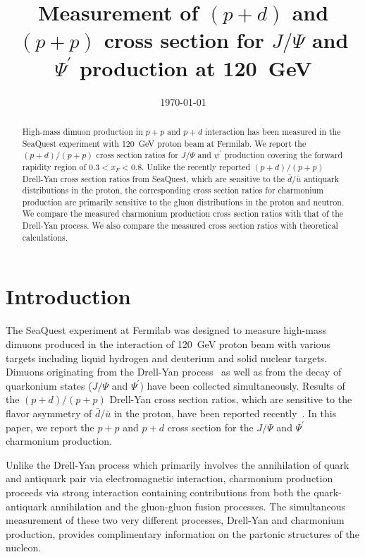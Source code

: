 \documentclass[reprint,aps,unsortedaddress,superscriptaddress,prd,floatfix,showpacs,linenumbers]{revtex4-2}
\begin{document}
\title{Measurement of $(p+d)$ and $(p+p)$ cross section for
	$J/\Psi$ and $\Psi^\prime$ production at \SI{120}{\GeV}}


\date{\today}
\begin{abstract}
	High-mass dimuon production in $p+p$ and $p+d$ interaction has been measured
	in the SeaQuest experiment with \SI{120}{\GeV} proton beam at Fermilab.
	We report the $(p+d) / (p+p)$ cross section
	ratios for $J/\Psi$ and $\psi^\prime$ production covering the forward
	rapidity region of $0.3 < x_F <0.8$. Unlike the recently reported
	$(p+d) / (p+p)$ Drell-Yan cross section ratios from SeaQuest, which are
	sensitive to the
	$\bar{d} / \bar{u}$ antiquark distributions in the proton, the corresponding
	cross section ratios for charmonium production are primarily
	sensitive to the gluon
	distributions in the proton and neutron. We compare the measured
	charmonium production cross section ratios with that of the
	Drell-Yan process. We also compare the measured cross section ratios with
	theoretical calculations.

\end{abstract}


\maketitle
\section{Introduction}
The SeaQuest experiment at Fermilab was designed to measure high-mass dimuons
produced in the interaction of \SI{120}{\GeV} proton beam with various targets
including liquid hydrogen and deuterium and solid nuclear targets. Dimuons
originating from the Drell-Yan process~\cite{drell1970} as well as from the decay of quarkonium
states ($J/\Psi$ and $\Psi^\prime$) have been collected simultaneously.
Results of the $(p+d) / (p+p)$ Drell-Yan cross section ratios, which are sensitive
to the flavor asymmetry of $\bar{d}/ \bar{u}$ in the proton, have been reported
recently~\cite{dove2021,dove2023}. In this paper, we report the
$p+p$ and $p+d$ cross section for the $J/\Psi$ and $\Psi^\prime$ charmonium production.

Unlike the Drell-Yan process which primarily involves the annihilation
of quark and antiquark pair via electromagnetic interaction, charmonium
production proceeds via strong interaction containing contributions from
both the quark-antiquark annihilation and the gluon-gluon
fusion processes. The simultaneous measurement of these two very different
processes, Drell-Yan and charmonium production, provides complimentary
information on the partonic structures of the nucleon.
\end{document}
